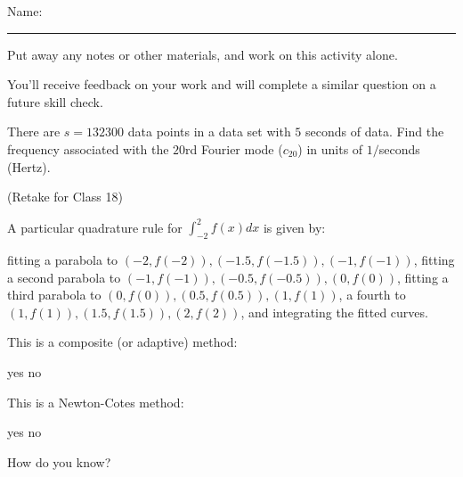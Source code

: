 \documentclass[12pt,letterpaper,noanswers]{exam}
\begin{document}
 \pdfpageheight 11in 
  \pdfpagewidth 8.5in

\noindent Name: \rule{2.5in}{0.5pt}

\noindent Put away any notes or other materials, and work on this activity alone.

\noindent You'll receive feedback on your work and will complete a similar question on a future skill check.


\begin{questions}
\item 
There are $s = 132300$ data points in a data set with $5$ seconds of data.  Find the frequency associated with the $20$rd Fourier mode ($c_{20}$) in units of $1/$seconds (Hertz).

\vspace{7cm}

\item (Retake for Class 18)

A particular quadrature rule for $\displaystyle\int_{-2}^2f(x)dx$ is given by:

fitting a parabola to $(-2,f(-2)), (-1.5,f(-1.5)), (-1,f(-1))$, fitting a second parabola to $(-1,f(-1)), (-0.5,f(-0.5)), (0,f(0))$, 
fitting a third parabola to $(0,f(0)), (0.5,f(0.5)), (1,f(1))$, a fourth to $(1,f(1)), (1.5,f(1.5)), (2,f(2))$, and integrating the fitted curves.

This is a composite (or adaptive) method:
\begin{oneparchoices}
\choice yes \choice no
\end{oneparchoices}

This is a Newton-Cotes method:
\begin{oneparchoices}
\choice yes \choice no
\end{oneparchoices}

How do you know?

\end{questions}
\end{document}
